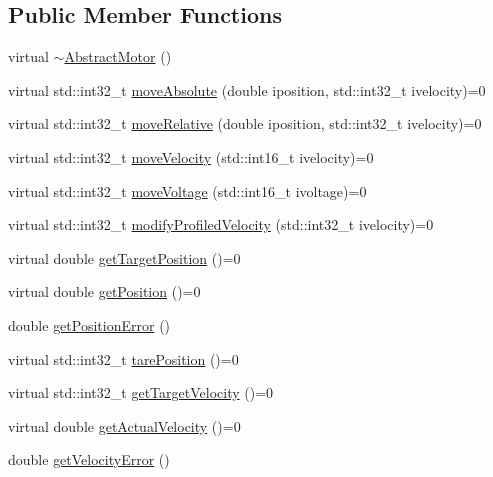 \subsection*{Public Member Functions}
\begin{DoxyCompactItemize}
\item 
virtual \mbox{\hyperlink{classokapi_1_1AbstractMotor_a2cc6e2eb96fc99c426c3e6dda9e8f3da}{$\sim$\+Abstract\+Motor}} ()
\item 
virtual std\+::int32\+\_\+t \mbox{\hyperlink{classokapi_1_1AbstractMotor_ab84ff0f3e39fa14dcf74bcc867863ff8}{move\+Absolute}} (double iposition, std\+::int32\+\_\+t ivelocity)=0
\item 
virtual std\+::int32\+\_\+t \mbox{\hyperlink{classokapi_1_1AbstractMotor_a5a65d70a30f536593326cb754700e240}{move\+Relative}} (double iposition, std\+::int32\+\_\+t ivelocity)=0
\item 
virtual std\+::int32\+\_\+t \mbox{\hyperlink{classokapi_1_1AbstractMotor_a3170268f8d06f728327dcda08505e02b}{move\+Velocity}} (std\+::int16\+\_\+t ivelocity)=0
\item 
virtual std\+::int32\+\_\+t \mbox{\hyperlink{classokapi_1_1AbstractMotor_a15d12555f527109b046c65fe753d7e20}{move\+Voltage}} (std\+::int16\+\_\+t ivoltage)=0
\item 
virtual std\+::int32\+\_\+t \mbox{\hyperlink{classokapi_1_1AbstractMotor_a1d131cbf0b8a325a54034e540c3be6d2}{modify\+Profiled\+Velocity}} (std\+::int32\+\_\+t ivelocity)=0
\item 
virtual double \mbox{\hyperlink{classokapi_1_1AbstractMotor_a144377e461ec5801289c37bab5132cce}{get\+Target\+Position}} ()=0
\item 
virtual double \mbox{\hyperlink{classokapi_1_1AbstractMotor_a4f9d74e054600c5ddb49ebb8164004d3}{get\+Position}} ()=0
\item 
double \mbox{\hyperlink{classokapi_1_1AbstractMotor_aaef41096c3a80f319f8fd42321726310}{get\+Position\+Error}} ()
\item 
virtual std\+::int32\+\_\+t \mbox{\hyperlink{classokapi_1_1AbstractMotor_ac36edbc92db85a11adcfee56275de15b}{tare\+Position}} ()=0
\item 
virtual std\+::int32\+\_\+t \mbox{\hyperlink{classokapi_1_1AbstractMotor_a96b02cca7b51f75c01d2d22aab474fe4}{get\+Target\+Velocity}} ()=0
\item 
virtual double \mbox{\hyperlink{classokapi_1_1AbstractMotor_a45b2013cc318577fad4ac38ad22ce219}{get\+Actual\+Velocity}} ()=0
\item 
double \mbox{\hyperlink{classokapi_1_1AbstractMotor_ada65f68f96d4e69b6740bd59e8418f94}{get\+Velocity\+Error}} ()

\end{DoxyCompactItemize}

